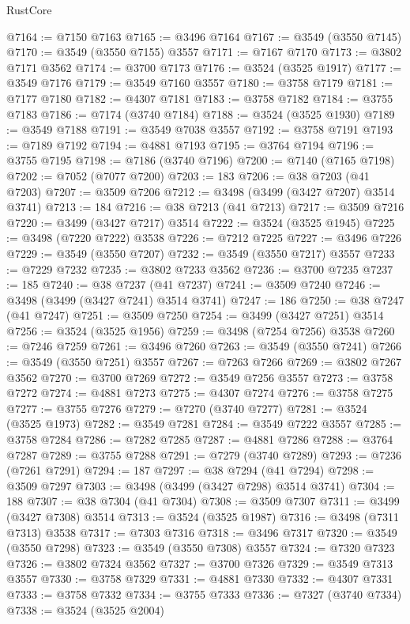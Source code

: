 \begin{lexlean}{RustCore}
\begin{coremodule}
@7164 := @7150 @7163
@7165 := @3496 @7164
@7167 := @3549 (@3550 @7145)
@7170 := @3549 (@3550 @7155) @3557
@7171 := @7167 @7170
@7173 := @3802 @7171 @3562
@7174 := @3700 @7173
@7176 := @3524 (@3525 @1917)
@7177 := @3549 @7176
@7179 := @3549 @7160 @3557
@7180 := @3758 @7179
@7181 := @7177 @7180
@7182 := @4307 @7181
@7183 := @3758 @7182
@7184 := @3755 @7183
@7186 := @7174 (@3740 @7184)
@7188 := @3524 (@3525 @1930)
@7189 := @3549 @7188
@7191 := @3549 @7038 @3557
@7192 := @3758 @7191
@7193 := @7189 @7192
@7194 := @4881 @7193
@7195 := @3764 @7194
@7196 := @3755 @7195
@7198 := @7186 (@3740 @7196)
@7200 := @7140 (@7165 @7198)
@7202 := @7052 (@7077 @7200)
@7203 := 183
@7206 := @38 @7203 (@41 @7203)
@7207 := @3509 @7206
@7212 := @3498 (@3499 (@3427 @7207) @3514 @3741)
@7213 := 184
@7216 := @38 @7213 (@41 @7213)
@7217 := @3509 @7216
@7220 := @3499 (@3427 @7217) @3514
@7222 := @3524 (@3525 @1945)
@7225 := @3498 (@7220 @7222) @3538
@7226 := @7212 @7225
@7227 := @3496 @7226
@7229 := @3549 (@3550 @7207)
@7232 := @3549 (@3550 @7217) @3557
@7233 := @7229 @7232
@7235 := @3802 @7233 @3562
@7236 := @3700 @7235
@7237 := 185
@7240 := @38 @7237 (@41 @7237)
@7241 := @3509 @7240
@7246 := @3498 (@3499 (@3427 @7241) @3514 @3741)
@7247 := 186
@7250 := @38 @7247 (@41 @7247)
@7251 := @3509 @7250
@7254 := @3499 (@3427 @7251) @3514
@7256 := @3524 (@3525 @1956)
@7259 := @3498 (@7254 @7256) @3538
@7260 := @7246 @7259
@7261 := @3496 @7260
@7263 := @3549 (@3550 @7241)
@7266 := @3549 (@3550 @7251) @3557
@7267 := @7263 @7266
@7269 := @3802 @7267 @3562
@7270 := @3700 @7269
@7272 := @3549 @7256 @3557
@7273 := @3758 @7272
@7274 := @4881 @7273
@7275 := @4307 @7274
@7276 := @3758 @7275
@7277 := @3755 @7276
@7279 := @7270 (@3740 @7277)
@7281 := @3524 (@3525 @1973)
@7282 := @3549 @7281
@7284 := @3549 @7222 @3557
@7285 := @3758 @7284
@7286 := @7282 @7285
@7287 := @4881 @7286
@7288 := @3764 @7287
@7289 := @3755 @7288
@7291 := @7279 (@3740 @7289)
@7293 := @7236 (@7261 @7291)
@7294 := 187
@7297 := @38 @7294 (@41 @7294)
@7298 := @3509 @7297
@7303 := @3498 (@3499 (@3427 @7298) @3514 @3741)
@7304 := 188
@7307 := @38 @7304 (@41 @7304)
@7308 := @3509 @7307
@7311 := @3499 (@3427 @7308) @3514
@7313 := @3524 (@3525 @1987)
@7316 := @3498 (@7311 @7313) @3538
@7317 := @7303 @7316
@7318 := @3496 @7317
@7320 := @3549 (@3550 @7298)
@7323 := @3549 (@3550 @7308) @3557
@7324 := @7320 @7323
@7326 := @3802 @7324 @3562
@7327 := @3700 @7326
@7329 := @3549 @7313 @3557
@7330 := @3758 @7329
@7331 := @4881 @7330
@7332 := @4307 @7331
@7333 := @3758 @7332
@7334 := @3755 @7333
@7336 := @7327 (@3740 @7334)
@7338 := @3524 (@3525 @2004)

\end{coremodule}
\end{lexlean}
